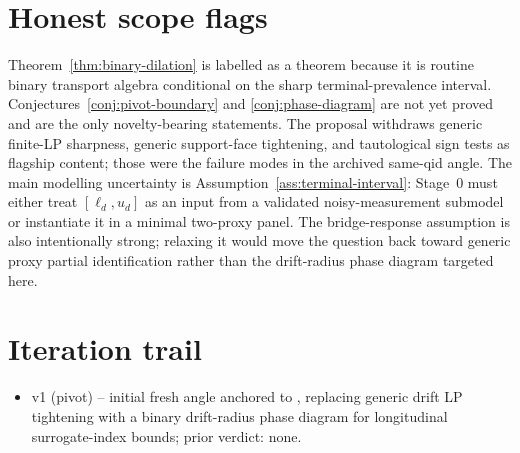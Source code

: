 \documentclass[11pt]{article}
\theoremstyle{definition}
\theoremstyle{plain}
\theoremstyle{remark}
\begin{document}
\section{Honest scope flags}
Theorem~\ref{thm:binary-dilation} is labelled as a theorem because it is routine binary transport algebra conditional on the sharp terminal-prevalence interval.  Conjectures~\ref{conj:pivot-boundary} and \ref{conj:phase-diagram} are not yet proved and are the only novelty-bearing statements.  The proposal withdraws generic finite-LP sharpness, generic support-face tightening, and tautological sign tests as flagship content; those were the failure modes in the archived same-qid angle.  The main modelling uncertainty is Assumption~\ref{ass:terminal-interval}: Stage~0 must either treat \([\ell_d,u_d]\) as an input from a validated noisy-measurement submodel or instantiate it in a minimal two-proxy panel.  The bridge-response assumption is also intentionally strong; relaxing it would move the question back toward generic proxy partial identification rather than the drift-radius phase diagram targeted here.

\section{Iteration trail}
\begin{itemize}[leftmargin=*]
\item v1 (pivot) -- initial fresh angle anchored to \citet{HuangWangYuanZhaoZhang2026}, replacing generic drift LP tightening with a binary drift-radius phase diagram for longitudinal surrogate-index bounds; prior verdict: none.
\end{itemize}
\end{document}

